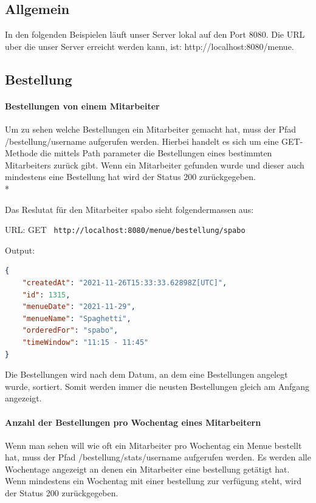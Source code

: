 \subsection{Allgemein}

In den folgenden Beispielen läuft unser Server lokal auf den Port 8080. Die URL uber die unser
Server erreicht werden kann, ist: http://localhost:8080/menue.

\subsection{Bestellung}

\paragraph{Bestellungen von einem Mitarbeiter}

Um zu sehen welche Bestellungen ein Mitarbeiter gemacht hat, muss der Pfad /bestellung/{username} aufgerufen werden. 
Hierbei handelt es sich um eine GET-Methode die mittels Path parameter die Bestellungen eines bestimmten Mitarbeiters zurück gibt.
Wenn ein Mitarbeiter gefunden wurde und dieser auch mindestens eine Bestellung hat wird der Status 200 zurückgegeben. \\*

Das Reslutat für den Mitarbeiter spabo sieht folgendermassen aus:


URL: GET \colorbox{white}{\lstinline[basicstyle=\ttfamily\color{black},language=html]| http://localhost:8080/menue/bestellung/spabo|}


Output:

\begin{lstlisting}[language=json,firstnumber=1]
{
    "createdAt": "2021-11-26T15:33:33.62898Z[UTC]",
    "id": 1315,
    "menueDate": "2021-11-29",
    "menueName": "Spaghetti",
    "orderedFor": "spabo",
    "timeWindow": "11:15 - 11:45"
}
\end{lstlisting}

Die Bestellungen wird nach dem Datum, an dem eine Bestellungen angelegt wurde, sortiert. Somit werden immer die neusten Bestellungen gleich am Anfgang angezeigt.

\paragraph{Anzahl der Bestellungen pro Wochentag eines Mitarbeitern}

Wenn man sehen will wie oft ein Mitarbeiter pro Wochentag ein Menue bestellt hat, muss der Pfad /bestellung/stats/{username} aufgerufen werden.
Es werden alle Wochentage angezeigt an denen ein Mitarbeiter eine bestellung getätigt hat. Wenn mindestens ein Wochentag mit einer bestellung zur verfügung steht, wird der Status 200 zurückgegeben.

